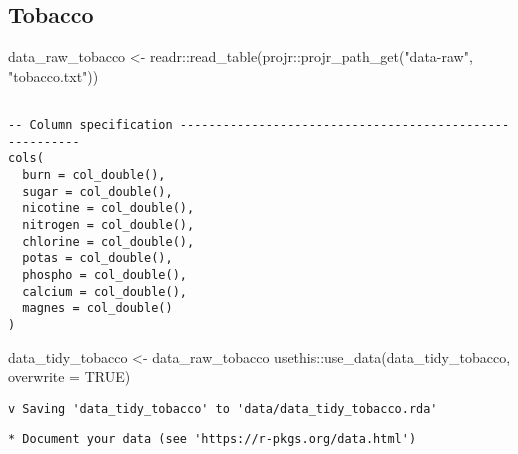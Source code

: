 \documentclass[
  letterpaper,
  DIV=11,
  numbers=noendperiod]{scrartcl}
\newenvironment{Shaded}{\begin{snugshade}}{\end{snugshade}}
\newcommand{\AttributeTok}[1]{\textcolor[rgb]{0.40,0.45,0.13}{#1}}
\newcommand{\ConstantTok}[1]{\textcolor[rgb]{0.56,0.35,0.01}{#1}}
\newcommand{\FunctionTok}[1]{\textcolor[rgb]{0.28,0.35,0.67}{#1}}
\newcommand{\NormalTok}[1]{\textcolor[rgb]{0.00,0.23,0.31}{#1}}
\newcommand{\OtherTok}[1]{\textcolor[rgb]{0.00,0.23,0.31}{#1}}
\newcommand{\SpecialCharTok}[1]{\textcolor[rgb]{0.37,0.37,0.37}{#1}}
\newcommand{\StringTok}[1]{\textcolor[rgb]{0.13,0.47,0.30}{#1}}
\begin{document}
\hypertarget{tobacco}{%
\subsection{Tobacco}\label{tobacco}}

\begin{Shaded}
\begin{Highlighting}[]
\NormalTok{data\_raw\_tobacco }\OtherTok{\textless{}{-}}\NormalTok{ readr}\SpecialCharTok{::}\FunctionTok{read\_table}\NormalTok{(projr}\SpecialCharTok{::}\FunctionTok{projr\_path\_get}\NormalTok{(}\StringTok{"data{-}raw"}\NormalTok{, }\StringTok{"tobacco.txt"}\NormalTok{))}
\end{Highlighting}
\end{Shaded}

\begin{verbatim}

-- Column specification --------------------------------------------------------
cols(
  burn = col_double(),
  sugar = col_double(),
  nicotine = col_double(),
  nitrogen = col_double(),
  chlorine = col_double(),
  potas = col_double(),
  phospho = col_double(),
  calcium = col_double(),
  magnes = col_double()
)
\end{verbatim}

\begin{Shaded}
\begin{Highlighting}[]
\NormalTok{data\_tidy\_tobacco }\OtherTok{\textless{}{-}}\NormalTok{ data\_raw\_tobacco}
\NormalTok{usethis}\SpecialCharTok{::}\FunctionTok{use\_data}\NormalTok{(data\_tidy\_tobacco, }\AttributeTok{overwrite =} \ConstantTok{TRUE}\NormalTok{)}
\end{Highlighting}
\end{Shaded}

\begin{verbatim}
v Saving 'data_tidy_tobacco' to 'data/data_tidy_tobacco.rda'
\end{verbatim}

\begin{verbatim}
* Document your data (see 'https://r-pkgs.org/data.html')
\end{verbatim}
\end{document}

